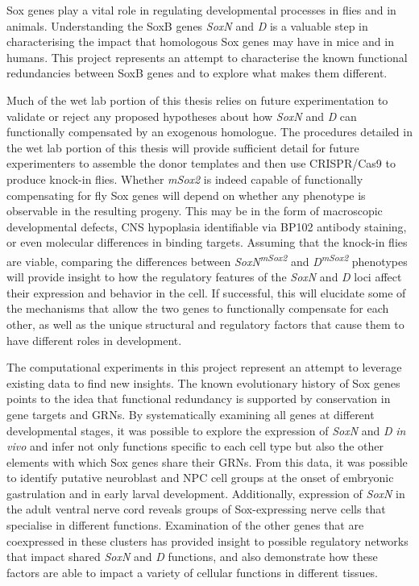 \documentclass[withindex,glossary]{cam-thesis}
\begin{document}
Sox genes play a vital role in regulating developmental processes in
flies and in animals. Understanding the SoxB genes \emph{SoxN} and
\emph{D} is a valuable step in characterising the impact that homologous
Sox genes may have in mice and in humans. This project represents an
attempt to characterise the known functional redundancies between SoxB
genes and to explore what makes them different.

Much of the wet lab portion of this thesis relies on future
experimentation to validate or reject any proposed hypotheses about how
\emph{SoxN} and \emph{D} can functionally compensated by an exogenous
homologue. The procedures detailed in the wet lab portion of this thesis
will provide sufficient detail for future experimenters to assemble the
donor templates and then use CRISPR/Cas9 to produce knock-in flies.
Whether \emph{mSox2} is indeed capable of functionally compensating for
fly Sox genes will depend on whether any phenotype is observable in the
resulting progeny. This may be in the form of macroscopic developmental
defects, CNS hypoplasia identifiable via BP102 antibody staining, or
even molecular differences in binding targets. Assuming that the
knock-in flies are viable, comparing the differences between
\emph{SoxN\textsuperscript{mSox2}} and \emph{D\textsuperscript{mSox2}}
phenotypes will provide insight to how the regulatory features of the
\emph{SoxN} and \emph{D} loci affect their expression and behavior in
the cell. If successful, this will elucidate some of the mechanisms that
allow the two genes to functionally compensate for each other, as well
as the unique structural and regulatory factors that cause them to have
different roles in development.

The computational experiments in this project represent an attempt to
leverage existing data to find new insights. The known evolutionary
history of Sox genes points to the idea that functional redundancy is
supported by conservation in gene targets and GRNs. By systematically
examining all genes at different developmental stages, it was possible
to explore the expression of \emph{SoxN} and \emph{D} \emph{in vivo} and
infer not only functions specific to each cell type but also the other
elements with which Sox genes share their GRNs. From this data, it was
possible to identify putative neuroblast and NPC cell groups at the
onset of embryonic gastrulation and in early larval development.
Additionally, expression of \emph{SoxN} in the adult ventral nerve cord
reveals groups of Sox-expressing nerve cells that specialise in
different functions. Examination of the other genes that are coexpressed
in these clusters has provided insight to possible regulatory networks
that impact shared \emph{SoxN} and \emph{D} functions, and also
demonstrate how these factors are able to impact a variety of cellular
functions in different tissues.
\end{document}
